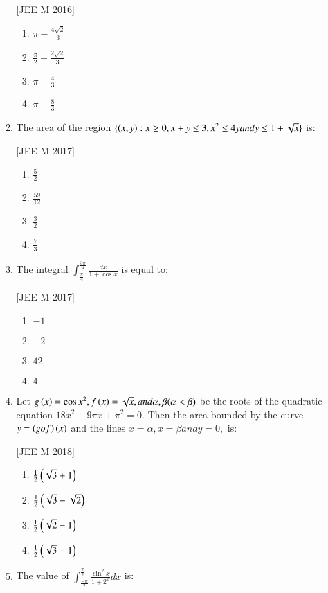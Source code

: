 \documentclass[journal,12pt,twocolumn]{IEEEtran}
\theoremstyle{remark}
\begin{document}
\begin{enumerate}
\begin{enumerate}
		\hfill{[JEE M 2016]}
		\begin{enumerate}
			\item $\pi - \frac{4\sqrt{2}}{3}$

			\item $\frac{\pi}{2}-\frac{2\sqrt{2}}{3}$

			\item $\pi - \frac{4}{3}$

			\item $\pi - \frac{8}{3}$
		\end{enumerate}
	\item The area  of the region $\{\left(x,y\right): x\geq0, x+y\leq3, x^{2}\leq4y and y\leq1+\sqrt{x}\}$ is:

		\hfill{[JEE M 2017]}
		\begin{enumerate}
			\item $\frac{5}{2}$

			\item $\frac{59}{12}$

			\item $\frac{3}{2}$

			\item $\frac{7}{3}$
		\end{enumerate}
	\item The integral $\int_{\frac{\pi}{4}}^{\frac{3\pi}{4}}\frac{dx}{1+\cos x}$ is equal to:

		\hfill{[JEE M 2017]}
		\begin{enumerate}
			\item $-1$
			\item $-2$
			\item $42$
			\item $4$
		\end{enumerate}
	\item Let $g\left(x\right)=\cos x^{2}, f\left(x\right)=\sqrt{x}, and \alpha, \beta (\alpha<\beta)$ be the roots of the quadratic equation $18x^{2}-9\pi x+\pi^{2}=0.$ Then the area  bounded by the curve $y=\left(gof\right)\left(x\right)$ and the lines $x=\alpha, x=\beta and y=0,$ is:

		\hfill{[JEE M 2018]}
		\begin{enumerate}
			\item $\frac{1}{2}\left(\sqrt{3}+1\right)$
			\item $\frac{1}{2}\left(\sqrt{3}-\sqrt{2}\right)$
			\item $\frac{1}{2}\left(\sqrt{2}-1\right)$
			\item $\frac{1}{2}\left(\sqrt{3}-1\right)$
		\end{enumerate}
	\item The value of $\int_{\frac{-\pi}{2}}^{\frac{\pi}{2}}\frac{\sin^{2} x}{1+2^{x}}dx$ is:


\end{enumerate}
\end{enumerate}
\end{document}
